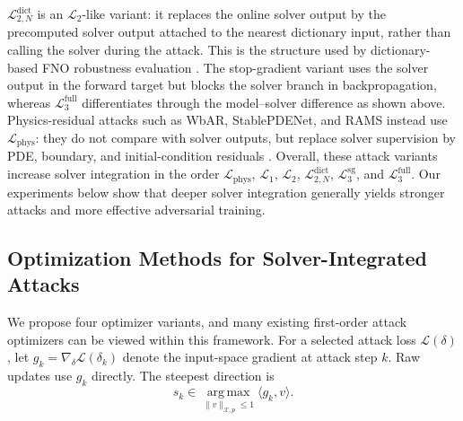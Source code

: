 \documentclass[letterpaper]{article} %
\begin{document}
$\mathcal{L}_{2,N}^{\mathrm{dict}}$ is an $\mathcal{L}_2$-like variant: it
replaces the online solver output by the precomputed solver output attached to
the nearest dictionary input, rather than calling the solver during the attack.
This is the structure used by dictionary-based FNO robustness evaluation
\citep{adesoji2022evaluating}. The stop-gradient variant uses the solver output
in the forward target but blocks the solver branch in backpropagation, whereas
$\mathcal{L}_3^{\mathrm{full}}$ differentiates through the model--solver
difference as shown above. Physics-residual attacks such as WbAR, StablePDENet,
and RAMS instead use $\mathcal{L}_{\mathrm{phys}}$: they do not compare with
solver outputs, but replace solver supervision by PDE, boundary, and
initial-condition residuals
\citep{shi2025wbar,huang2026stablepdenet,ouyang2025rams}.
Overall, these attack variants increase solver integration in the order
$\mathcal{L}_{\mathrm{phys}}$, $\mathcal{L}_1$, $\mathcal{L}_2$,
$\mathcal{L}_{2,N}^{\mathrm{dict}}$, $\mathcal{L}_3^{\mathrm{sg}}$, and
$\mathcal{L}_3^{\mathrm{full}}$.
Our experiments below show that deeper solver integration generally yields
stronger attacks and more effective adversarial training.

\subsection{Optimization Methods for Solver-Integrated Attacks}

We propose four optimizer variants, and many existing first-order attack
optimizers can be viewed within this framework. For a selected attack loss
$\mathcal{L}(\delta)$, let
$g_k=\nabla_\delta\mathcal{L}(\delta_k)$ denote the input-space gradient at
attack step $k$. Raw updates use $g_k$ directly. The steepest direction is
\begin{equation*}
  s_k \in \operatorname*{arg\,max}_{\|v\|_{\mathcal{X},p}\le 1}
  \langle g_k,v\rangle .
\end{equation*}
\end{document}
